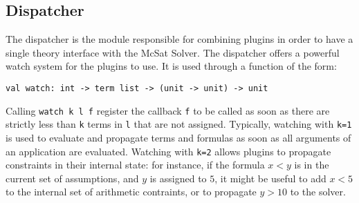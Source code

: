 \subsection{Dispatcher}

The dispatcher is the module responsible for combining plugins in order
to have a single theory interface with the McSat Solver. The dispatcher
offers a powerful watch system for the plugins to use. It is used through
a function of the form:
\begin{lstlisting}
val watch: int -> term list -> (unit -> unit) -> unit
\end{lstlisting}

Calling \lstinline{watch k l f} register the callback \lstinline{f} to be called
as soon as there are strictly less than \lstinline{k} terms in \lstinline{l} that
are not assigned. Typically, watching with \lstinline{k=1} is used to evaluate and
propagate terms and formulas as soon as all arguments of an application are evaluated.
Watching with \lstinline{k=2} allows plugins to propagate constraints in their internal
state: for instance, if the formula $x < y$ is in the current set of assumptions,
and $y$ is assigned to $5$, it might be useful to add $x < 5$ to the internal set of
arithmetic contraints, or to propagate $y > 10$ to the solver.

